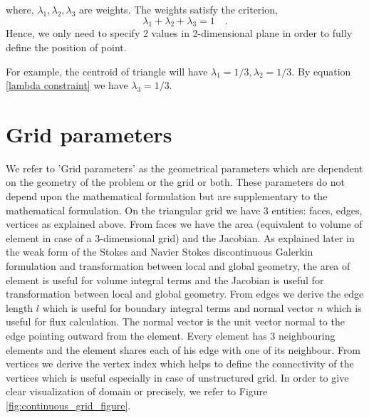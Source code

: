 \documentclass[a4paper,openany]{book}
\begin{document}
where, $\lambda_1, \lambda_2, \lambda_3$ are weights. The weights satisfy the criterion, 
\begin{equation}\label{lambda constraint} 
\lambda_1 + \lambda_2 + \lambda_3 = 1 \quad \textrm{.}
\end{equation}
Hence, we only need to specify 2 values in 2-dimensional plane in order to fully define the position of point.

For example, the centroid of triangle will have $\lambda_1 = 1/3, \lambda_2 = 1/3$. By equation \eqref{lambda constraint} we have $\lambda_3=1/3$.

\section{Grid parameters}

We refer to 'Grid parameters' as the geometrical parameters which are dependent on the geometry of the problem or the grid or both. These parameters do not depend upon the mathematical formulation but are supplementary to the mathematical formulation. On the triangular grid we have 3 entities: faces, edges, vertices as explained above. From faces we have the area (equivalent to volume of element in case of a 3-dimensional grid) and the Jacobian. As explained later in the weak form of the Stokes and Navier Stokes discontinuous Galerkin formulation and transformation between local and global geometry, the area of element is useful for volume integral terms and the Jacobian is useful for transformation between local and global geometry. From edges we derive the edge length $l$ which is useful for boundary integral terms and normal vector $n$ which is useful for flux calculation. The normal vector is the unit vector normal to the edge pointing outward from the element. Every element has 3 neighbouring elements and the element shares each of his edge with one of its neighbour. From vertices we derive the vertex index which helps to define the connectivity of the vertices which is useful especially in case of unstructured grid. In order to give clear visualization of domain or precisely, we refer to Figure \ref{fig:continuous_grid_figure}.
\end{document}
